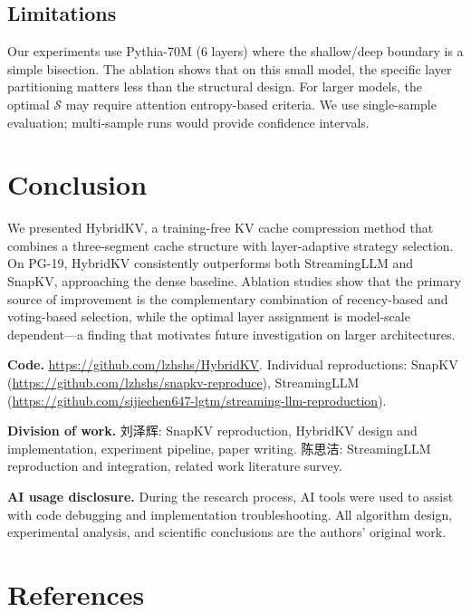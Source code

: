 \documentclass{article}
\begin{document}
\subsection{Limitations}

Our experiments use Pythia-70M (6 layers) where the shallow/deep boundary is a simple bisection. The ablation shows that on this small model, the specific layer partitioning matters less than the structural design. For larger models, the optimal $\mathcal{S}$ may require attention entropy-based criteria. We use single-sample evaluation; multi-sample runs would provide confidence intervals.

\section{Conclusion}

We presented HybridKV, a training-free KV cache compression method that combines a three-segment cache structure with layer-adaptive strategy selection. On PG-19, HybridKV consistently outperforms both StreamingLLM and SnapKV, approaching the dense baseline. Ablation studies show that the primary source of improvement is the complementary combination of recency-based and voting-based selection, while the optimal layer assignment is model-scale dependent---a finding that motivates future investigation on larger architectures.

\textbf{Code.} \url{https://github.com/lzhshs/HybridKV}. Individual reproductions: SnapKV (\url{https://github.com/lzhshs/snapkv-reproduce}), StreamingLLM (\url{https://github.com/sijiechen647-lgtm/streaming-llm-reproduction}).

\textbf{Division of work.} 刘泽辉: SnapKV reproduction, HybridKV design and implementation, experiment pipeline, paper writing. 陈思洁: StreamingLLM reproduction and integration, related work literature survey.

\textbf{AI usage disclosure.} During the research process, AI tools were used to assist with code debugging and implementation troubleshooting. All algorithm design, experimental analysis, and scientific conclusions are the authors' original work.

\section*{References}
\end{document}
